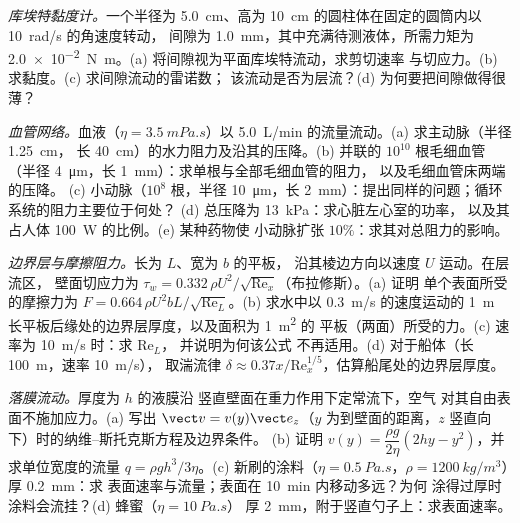 \begin{exercise}[$\star\star$]\label{exo:b2:viscous-flows:9}
\emph{库埃特黏度计。}一个半径为 \qty{5.0}{cm}、高为 
\qty{10}{cm} 的圆柱体在固定的圆筒内以 \qty{10}{rad/s} 的角速度转动，
间隙为 \qty{1.0}{mm}，其中充满待测液体，所需力矩为 
\qty{2.0e-2}{N.m}。(a) 将间隙视为平面库埃特流动，求剪切速率
与切应力。(b) 求黏度。(c) 求间隙流动的雷诺数；
该流动是否为层流？(d) 为何要把间隙做得很薄？
\end{exercise}

\begin{exercise}[$\star\star\star$]\label{exo:b2:viscous-flows:10}
\emph{血管网络。}血液（$\eta = \qty{3.5}{mPa.s}$）以 
\qty{5.0}{L/min} 的流量流动。(a) 求主动脉（半径 \qty{1.25}{cm}，
长 \qty{40}{cm}）的水力阻力及沿其的压降。(b) 并联的 $10^{10}$ 
根毛细血管（半径 \qty{4}{\micro m}，长 \qty{1}{mm}）：求单根与全部毛细血管的阻力，
以及毛细血管床两端的压降。
(c) 小动脉（$10^8$ 根，半径 \qty{10}{\micro m}，长 
\qty{2}{mm}）：提出同样的问题；循环系统的阻力主要位于何处？
(d) 总压降为 \qty{13}{kPa}：求心脏左心室的功率，
以及其占人体 \qty{100}{W} 的比例。(e) 某种药物使
小动脉扩张 $10\%$：求其对总阻力的影响。
\end{exercise}

\begin{exercise}[$\star\star\star$]\label{exo:b2:viscous-flows:11}
\emph{边界层与摩擦阻力。}长为 $L$、宽为 $b$ 的平板，
沿其棱边方向以速度 $U$ 运动。在层流区，
壁面切应力为 $\tau_w = 0.332\,\rho U^2/\sqrt{\mathrm{Re}_x}$（布拉修斯）。(a) 证明
单个表面所受的摩擦力为 $F = 0.664\,\rho U^2bL/\sqrt{\mathrm{Re}_L}$。(b) 求水中以 \qty{0.3}{m/s} 的速度运动的 
\qty{1}{m} 长平板后缘处的边界层厚度，以及面积为 \qty{1}{m^2} 的
平板（两面）所受的力。(c) 速率为 \qty{10}{m/s} 时：求 $\mathrm{Re}_L$，
并说明为何该公式
不再适用。(d) 对于船体（长 \qty{100}{m}，速率 \qty{10}{m/s}），
取湍流律 $\delta \approx
0.37x/\mathrm{Re}_x^{1/5}$，估算船尾处的边界层厚度。
\end{exercise}

\begin{exercise}[$\star\star\star$]\label{exo:b2:viscous-flows:12}
\emph{落膜流动。}厚度为 $h$ 的液膜沿
竖直壁面在重力作用下定常流下，空气
对其自由表面不施加应力。(a) 写出 $\vect v = v(y)\vect e_z$（$y$
为到壁面的距离，$z$ 竖直向下）时的纳维–斯托克斯方程及边界条件。
(b) 证明 $v(y) = \dfrac{\rho g}{2\eta}(2hy - y^2)$，并
求单位宽度的流量 $q = \rho gh^3/3\eta$。(c) 新刷的涂料（$\eta =
\qty{0.5}{Pa.s}$，$\rho = \qty{1200}{kg/m^3}$）厚 \qty{0.2}{mm}：求
表面速率与流量；表面在 \qty{10}{min} 内移动多远？为何
涂得过厚时涂料会流挂？(d) 蜂蜜（$\eta = \qty{10}{Pa.s}$）
厚 \qty{2}{mm}，附于竖直勺子上：求表面速率。
\end{exercise}

